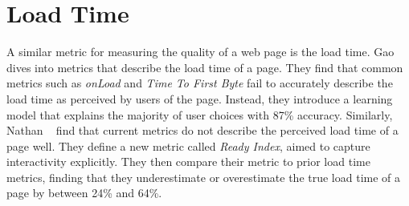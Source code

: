 \section{Load Time}\label{sec:related-work:load-time}
A similar metric for measuring the quality of a web page is the load time. Gao \etal{}~\cite{gao2017perceived} dives into metrics that describe the load time of a page. They find that common metrics such as \emph{onLoad} and \emph{Time To First Byte} fail to accurately describe the load time as perceived by users of the page. Instead, they introduce a learning model that explains the majority of user choices with 87\% accuracy. 
Similarly, Nathan \etal{}~\cite{nathan2018measuring} find that current metrics do not describe the perceived load time of a page well. They define a new metric called \emph{Ready Index}, aimed to capture interactivity explicitly. They then compare their metric to prior load time metrics, finding that they underestimate or overestimate the true load time of a page by between 24\% and 64\%. 